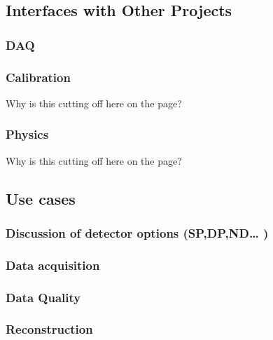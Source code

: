 \subsection{Interfaces with Other Projects}	
\label{ch:exec-comp-mod-intfc}


\subsubsection{DAQ}
\label{ch:exec-comp-mod-intfc-daq}


\subsubsection{Calibration}
\label{ch:exec-comp-mod-intfc-calib}

Why is this cutting off here on the page?

\subsubsection{Physics}
\label{ch:exec-comp-mod-intfc-phys}

Why is this cutting off here on the page?

\subsection{Use cases}	
\label{ch:exec-comp-mod-use}


\subsubsection{Discussion of detector options (SP,DP,ND… )}
\label{ch:exec-comp-mod-use-opt}


\subsubsection{Data acquisition}
\label{ch:exec-comp-mod-use-daq}


\subsubsection{Data Quality}
\label{ch:exec-comp-mod-use-dq}


\subsubsection{Reconstruction}
\label{ch:exec-comp-mod-use-reco}


